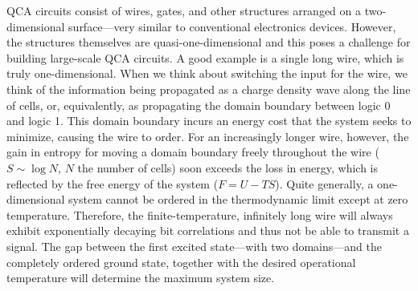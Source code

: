 QCA circuits consist of wires, gates, and other structures arranged on a
two-dimensional surface---very similar to conventional electronics devices.
However, the structures themselves are quasi-one-dimensional and this poses a
challenge for building large-scale QCA circuits. A good example is a single long
wire, which is truly one-dimensional. When we think about switching the input
for the wire, we think of the information being propagated as a charge density
wave along the line of cells, or, equivalently, as propagating the domain
boundary between logic 0 and logic 1. This domain boundary incurs an energy cost
that the system seeks to minimize, causing the wire to order. For an
increasingly longer wire, however, the gain in entropy for moving a domain
boundary freely throughout the wire ($S \sim \log N$, $N$ the number of cells)
soon exceeds the loss in energy, which is reflected by the free energy of the
system ($F = U - T S$). Quite generally, a one-dimensional system cannot be
ordered in the thermodynamic limit except at zero temperature. Therefore, the
finite-temperature, infinitely long wire will always exhibit exponentially
decaying bit correlations and thus not be able to transmit a signal. The gap
between the first excited state---with two domains---and the completely ordered
ground state, together with the desired operational temperature will determine
the maximum system size.

